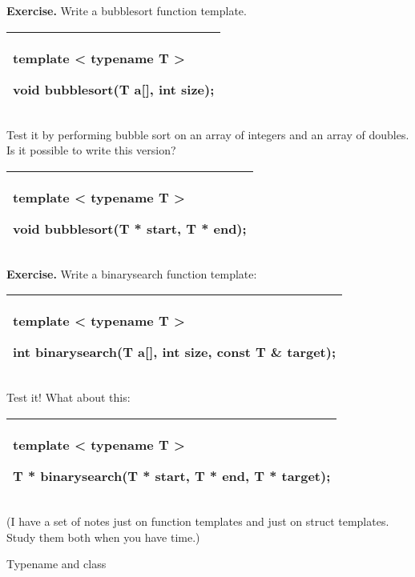 \documentclass[
]{article}
\begin{document}
\textbf{Exercise.} Write a bubblesort function template.

\begin{longtable}[]{@{}l@{}}
\toprule
\endhead
\begin{minipage}[t]{0.97\columnwidth}\raggedright
template \textless{} typename T \textgreater{}

void bubblesort(T a{[}{]}, int size);\strut
\end{minipage}\tabularnewline
\bottomrule
\end{longtable}

Test it by performing bubble sort on an array of integers and an array
of doubles. Is it possible to write this version?

\begin{longtable}[]{@{}l@{}}
\toprule
\endhead
\begin{minipage}[t]{0.97\columnwidth}\raggedright
template \textless{} typename T \textgreater{}

void bubblesort(T * start, T * end);\strut
\end{minipage}\tabularnewline
\bottomrule
\end{longtable}

\textbf{Exercise.} Write a binarysearch function template:

\begin{longtable}[]{@{}l@{}}
\toprule
\endhead
\begin{minipage}[t]{0.97\columnwidth}\raggedright
template \textless{} typename T \textgreater{}

int binarysearch(T a{[}{]}, int size, const T \& target);\strut
\end{minipage}\tabularnewline
\bottomrule
\end{longtable}

Test it! What about this:

\begin{longtable}[]{@{}l@{}}
\toprule
\endhead
\begin{minipage}[t]{0.97\columnwidth}\raggedright
template \textless{} typename T \textgreater{}

T * binarysearch(T * start, T * end, T * target);\strut
\end{minipage}\tabularnewline
\bottomrule
\end{longtable}

(I have a set of notes just on function templates and just on struct
templates. Study them both when you have time.)

Typename and class
\end{document}
